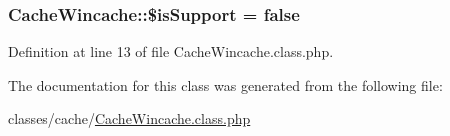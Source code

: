 \subsubsection[{\$is\+Support}]{\setlength{\rightskip}{0pt plus 5cm}Cache\+Wincache\+::\$is\+Support = false\hspace{0.3cm}{\ttfamily [static]}}\label{classCacheWincache_a633cb53cf9535236075169604bf363e3}


Definition at line 13 of file Cache\+Wincache.\+class.\+php.



The documentation for this class was generated from the following file\+:\begin{DoxyCompactItemize}
\item 
classes/cache/\hyperlink{CacheWincache_8class_8php}{Cache\+Wincache.\+class.\+php}\end{DoxyCompactItemize}
